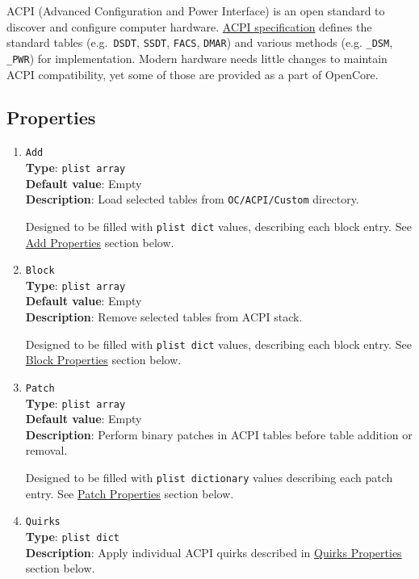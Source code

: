 \documentclass[]{article}
\begin{document}
ACPI (Advanced Configuration and Power Interface) is an open standard to
discover and configure computer hardware.
\href{https://uefi.org/specifications}{ACPI specification} defines the
standard tables (e.g.~\texttt{DSDT}, \texttt{SSDT}, \texttt{FACS}, \texttt{DMAR})
and various methods (e.g. \texttt{\_DSM}, \texttt{\_PWR}) for implementation.
Modern hardware needs little changes to maintain ACPI compatibility, yet
some of those are provided as a part of OpenCore.

\subsection{Properties}\label{acpiprops}

\begin{enumerate}
\item
  \texttt{Add}\\
  \textbf{Type}: \texttt{plist\ array}\\
  \textbf{Default value}: Empty\\
  \textbf{Description}: Load selected tables from \texttt{OC/ACPI/Custom}
  directory.

  Designed to be filled with \texttt{plist\ dict} values, describing each block entry.
  See \hyperref[acpipropsadd]{Add Properties} section below.

\item
  \texttt{Block}\\
  \textbf{Type}: \texttt{plist\ array}\\
  \textbf{Default value}: Empty\\
  \textbf{Description}: Remove selected tables from ACPI stack.

  Designed to be filled with \texttt{plist\ dict} values, describing each block entry.
  See \hyperref[acpipropsblock]{Block Properties} section below.

\item
  \texttt{Patch}\\
  \textbf{Type}: \texttt{plist\ array}\\
  \textbf{Default value}: Empty\\
  \textbf{Description}: Perform binary patches in ACPI tables before
  table addition or removal.

  Designed to be filled with \texttt{plist\ dictionary} values describing each
  patch entry. See \hyperref[acpipropspatch]{Patch Properties} section below.

\item
  \texttt{Quirks}\\
  \textbf{Type}: \texttt{plist\ dict}\\
  \textbf{Description}: Apply individual ACPI quirks described
  in \hyperref[acpipropsquirks]{Quirks Properties} section below.

\end{enumerate}
\end{document}
